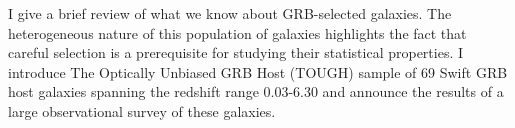 


\bigskip



\bigskip

\noindent I give a brief review of what we know about GRB-selected galaxies. The heterogeneous nature of this population of galaxies highlights the fact that careful selection is a prerequisite for studying their statistical properties. I introduce The Optically Unbiased GRB Host (TOUGH) sample of 69 Swift GRB host galaxies spanning the redshift range 0.03-6.30 and announce the  results of a large observational survey of these galaxies.
